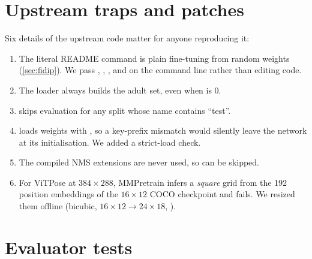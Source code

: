 \section{Upstream traps and patches}\label{app:patches}

Six details of the upstream code matter for anyone reproducing it:
\begin{enumerate}[label=(\roman*), leftmargin=*]
  \item The literal README command is plain fine-tuning from random weights (\cref{sec:fidip}). We pass , , ,  and  on the command line rather than editing code.
  \item The loader always builds the adult  set, even when  is 0.
  \item {} skips evaluation for any split whose name contains ``test''.
  \item {} loads weights with , so a key-prefix mismatch would silently leave the network at its initialisation. We added a strict-load check.
  \item The compiled NMS extensions are never used, so  can be skipped.
  \item For ViTPose at $384{\times}288$, MMPretrain infers a \emph{square} grid from the 192 position embeddings of the $16{\times}12$ COCO checkpoint and fails. We resized them offline (bicubic, $16{\times}12\to24{\times}18$, ).
\end{enumerate}

\begin{table}[h]
  \centering\small
  \caption[Patches to the vendored upstream code]{Patches to the vendored upstream code (), one commit each, generated from ~\S6.}
  \label{tab:patches}
\end{table}

\section{Evaluator tests}\label{app:tests}

